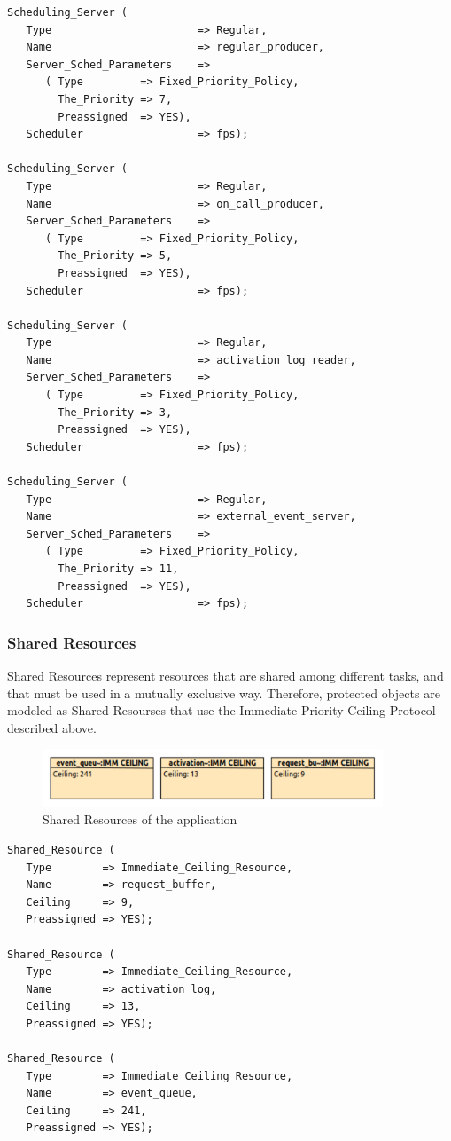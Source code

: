 \documentclass{article}
\begin{document}
\begin{lstlisting}
Scheduling_Server (
   Type                       => Regular,
   Name                       => regular_producer,
   Server_Sched_Parameters    =>
      ( Type         => Fixed_Priority_Policy,
        The_Priority => 7,
        Preassigned  => YES),
   Scheduler                  => fps);

Scheduling_Server (
   Type                       => Regular,
   Name                       => on_call_producer,
   Server_Sched_Parameters    =>
      ( Type         => Fixed_Priority_Policy,
        The_Priority => 5,
        Preassigned  => YES),
   Scheduler                  => fps);

Scheduling_Server (
   Type                       => Regular,
   Name                       => activation_log_reader,
   Server_Sched_Parameters    =>
      ( Type         => Fixed_Priority_Policy,
        The_Priority => 3,
        Preassigned  => YES),
   Scheduler                  => fps);

Scheduling_Server (
   Type                       => Regular,
   Name                       => external_event_server,
   Server_Sched_Parameters    =>
      ( Type         => Fixed_Priority_Policy,
        The_Priority => 11,
        Preassigned  => YES),
   Scheduler                  => fps);
\end{lstlisting}

\subsubsection{Shared Resources}

Shared Resources represent resources that are shared among different tasks, and that must be used in a mutually exclusive way. Therefore, protected objects are modeled as Shared Resourses that use the Immediate Priority Ceiling Protocol described above.

\begin{figure}[!htbp]
\centering
\includegraphics[width=4in]{images/shared-resources}
\caption{Shared Resources of the application}
\label{shared-resources}
\end{figure}

\begin{lstlisting}
Shared_Resource (
   Type        => Immediate_Ceiling_Resource,
   Name        => request_buffer,
   Ceiling     => 9,
   Preassigned => YES);

Shared_Resource (
   Type        => Immediate_Ceiling_Resource,
   Name        => activation_log,
   Ceiling     => 13,
   Preassigned => YES);

Shared_Resource (
   Type        => Immediate_Ceiling_Resource,
   Name        => event_queue,
   Ceiling     => 241,
   Preassigned => YES);
\end{lstlisting}
\end{document}
